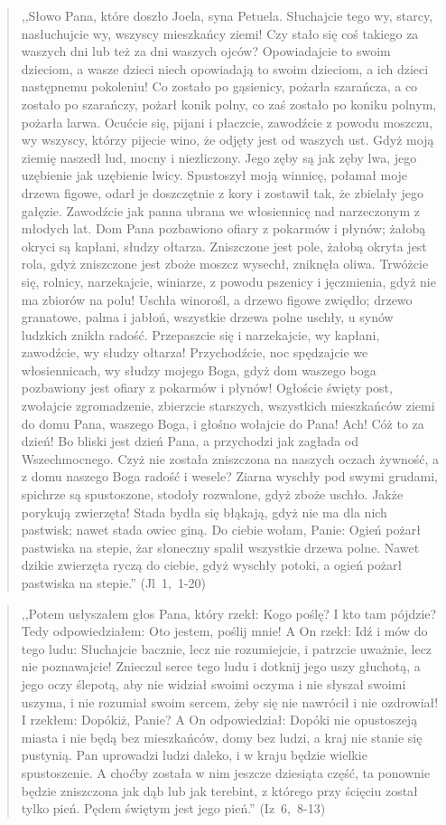 \documentclass[10pt,a4paper,oneside]{article}
\begin{document}
\begin{quote}
,,Słowo Pana, które doszło Joela, syna Petuela. Słuchajcie tego wy, starcy, nasłuchujcie wy, wszyscy mieszkańcy ziemi! Czy stało się coś takiego za waszych dni lub też za dni waszych ojców? Opowiadajcie to swoim dzieciom, a wasze dzieci niech opowiadają to swoim dzieciom, a ich dzieci następnemu pokoleniu! Co zostało po gąsienicy, pożarła szarańcza, a co zostało po szarańczy, pożarł konik polny, co zaś zostało po koniku polnym, pożarła larwa. Ocućcie się, pijani i płaczcie, zawodźcie z powodu moszczu, wy wszyscy, którzy pijecie wino, że odjęty jest od waszych ust. Gdyż moją ziemię naszedł lud, mocny i niezliczony. Jego zęby są jak zęby lwa, jego uzębienie jak uzębienie lwicy. Spustoszył moją winnicę, połamał moje drzewa figowe, odarł je doszczętnie z kory i zostawił tak, że zbielały jego gałęzie. Zawodźcie jak panna ubrana we włosiennicę nad narzeczonym z młodych lat. Dom Pana pozbawiono ofiary z pokarmów i płynów; żałobą okryci są kapłani, słudzy ołtarza. Zniszczone jest pole, żałobą okryta jest rola, gdyż zniszczone jest zboże moszcz wysechł, zniknęła oliwa. Trwóżcie się, rolnicy, narzekajcie, winiarze, z powodu pszenicy i jęczmienia, gdyż nie ma zbiorów na polu! Uschła winorośl, a drzewo figowe zwiędło; drzewo granatowe, palma i jabłoń, wszystkie drzewa polne uschły, u synów ludzkich znikła radość. Przepaszcie się i narzekajcie, wy kapłani, zawodźcie, wy słudzy ołtarza! Przychodźcie, noc spędzajcie we włosiennicach, wy słudzy mojego Boga, gdyż dom waszego boga pozbawiony jest ofiary z pokarmów i płynów! Ogłoście święty post, zwołajcie zgromadzenie, zbierzcie starszych, wszystkich mieszkańców ziemi do domu Pana, waszego Boga, i głośno wołajcie do Pana! Ach! Cóż to za dzień! Bo bliski jest dzień Pana, a przychodzi jak zagłada od Wszechmocnego. Czyż nie została zniszczona na naszych oczach żywność, a z domu naszego Boga radość i wesele? Ziarna wyschły pod swymi grudami, spichrze są spustoszone, stodoły rozwalone, gdyż zboże uschło. Jakże porykują zwierzęta! Stada bydła się błąkają, gdyż nie ma dla nich pastwisk; nawet stada owiec giną. Do ciebie wołam, Panie: Ogień pożarł pastwiska na stepie, żar słoneczny spalił wszystkie drzewa polne. Nawet dzikie zwierzęta ryczą do ciebie, gdyż wyschły potoki, a ogień pożarł pastwiska na stepie.'' \mbox{(Jl 1, 1-20)}
\end{quote}
\begin{quote}
,,Potem usłyszałem głos Pana, który rzekł: Kogo poślę? I kto tam pójdzie? Tedy odpowiedziałem: Oto jestem, poślij mnie! A On rzekł: Idź i mów do tego ludu: Słuchajcie bacznie, lecz nie rozumiejcie, i patrzcie uważnie, lecz nie poznawajcie! Znieczul serce tego ludu i dotknij jego uszy głuchotą, a jego oczy ślepotą, aby nie widział swoimi oczyma i nie słyszał swoimi uszyma, i nie rozumiał swoim sercem, żeby się nie nawrócił i nie ozdrowiał! I rzekłem: Dopókiż, Panie? A On odpowiedział: Dopóki nie opustoszeją miasta i nie będą bez mieszkańców, domy bez ludzi, a kraj nie stanie się pustynią. Pan uprowadzi ludzi daleko, i w kraju będzie wielkie spustoszenie. A choćby została w nim jeszcze dziesiąta część, ta ponownie będzie zniszczona jak dąb lub jak terebint, z którego przy ścięciu został tylko pień. Pędem świętym jest jego pień.'' \mbox{(Iz 6, 8-13)}
\end{quote}
\end{document}
